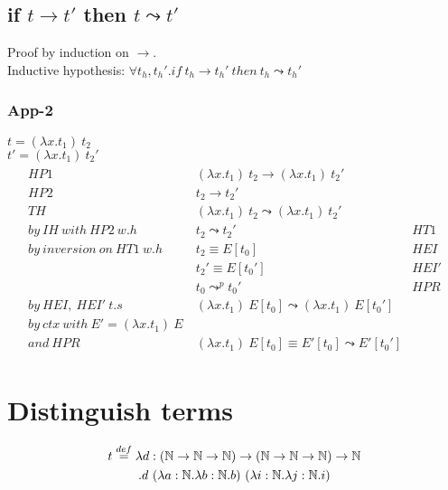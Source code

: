 \documentclass{article}
\newcommand{\N}{\ensuremath \mathbb N}
\newcommand{\lam}[2]{\ensuremath{\lambda#1.#2}}
\begin{document}
\subsection{if $t\to t'$ then $t\leadsto t'$}
Proof by induction on $\to$. \\
Inductive hypothesis: $\forall t_h,t_h'. if\ t_h\to t_h'\ then\ t_h\leadsto t_h'$
\subsubsection{App-2}
$t = (\lam{x}{t_1})\ t_2$ \\
$t'= (\lam{x}{t_1})\ t_2'$
\begin{align*}
    \begin{array}{rlr}
        HP1 & (\lam{x}{t_1})\ t_2 \to (\lam{x}{t_1})\ t_2' \\
        HP2 & t_2 \to t_2' \\
        TH  & (\lam{x}{t_1})\ t_2 \leadsto (\lam{x}{t_1})\ t_2' \\
        by\ IH\ with\ HP2\ w.h & t_2\leadsto t_2' & HT1 \\
        by\ inversion\ on\ HT1\ w.h & t_2 \equiv E[t_0] & HEI \\
                                    & t_2'\equiv E[t_0']  & HEI' \\
                                    & t_0 \leadsto^p t_0' & HPR \\
        by\ HEI,\ HEI'\ t.s         & (\lam{x}{t_1})\ E[t_0] \leadsto (\lam{x}{t_1})\ E[t_0'] \\
        by\ ctx\ with\ E' = (\lam{x}{t_1})\ E\ \\
        and\ HPR & (\lam{x}{t_1})\ E[t_0] \equiv E'[t_0]\leadsto E'[t_0']
    \end{array}
\end{align*}

\section{Distinguish terms}
\begin{multline*}
    t\overset{def}=\lam{d:(\N\to\N\to\N)\to(\N\to\N\to\N)\to\N\\}{d\ (\lam{a:\N}{\lam{b:\N}{b}})\ (\lam{i:\N}{\lam{j:\N}{i}})}
\end{multline*}
\end{document}
